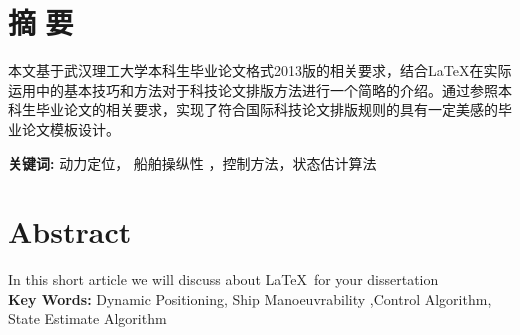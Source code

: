 \section*{ \centering 摘\,\,要}

\vskip0.5cm
本文基于武汉理工大学本科生毕业论文格式2013版的相关要求，结合\LaTeX 在实际运用中的基本技巧和方法对于科技论文排版方法进行一个简略的介绍。通过参照本科生毕业论文的相关要求，实现了符合国际科技论文排版规则的具有一定美感的毕业论文模板设计。


\textbf{关键词:}  动力定位， 船舶操纵性 ，控制方法，状态估计算法

\clearpage
\section*{ \centering \textbf{Abstract} }

In this short article we will discuss about \LaTeX\,  for your dissertation \\

\textbf{Key Words:} Dynamic Positioning, Ship Manoeuvrability ,Control Algorithm, State Estimate Algorithm

